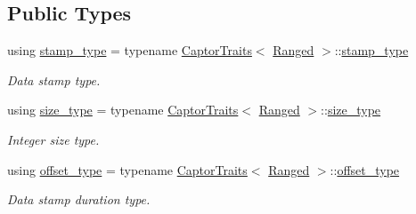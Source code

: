 \subsection*{Public Types}
\begin{DoxyCompactItemize}
\item 
\mbox{\label{classflow_1_1follower_1_1_ranged_aa2db50d33acca8540943e7de1d6da6ff}} 
using \hyperlink{classflow_1_1follower_1_1_ranged_aa2db50d33acca8540943e7de1d6da6ff}{stamp\+\_\+type} = typename \hyperlink{structflow_1_1_captor_traits}{Captor\+Traits}$<$ \hyperlink{classflow_1_1follower_1_1_ranged}{Ranged} $>$\+::\hyperlink{classflow_1_1follower_1_1_ranged_aa2db50d33acca8540943e7de1d6da6ff}{stamp\+\_\+type}
\begin{DoxyCompactList}\small\item\em Data stamp type. \end{DoxyCompactList}\item 
\mbox{\label{classflow_1_1follower_1_1_ranged_ae1fd4aebf292f42006e6185b32714c83}} 
using \hyperlink{classflow_1_1follower_1_1_ranged_ae1fd4aebf292f42006e6185b32714c83}{size\+\_\+type} = typename \hyperlink{structflow_1_1_captor_traits}{Captor\+Traits}$<$ \hyperlink{classflow_1_1follower_1_1_ranged}{Ranged} $>$\+::\hyperlink{classflow_1_1follower_1_1_ranged_ae1fd4aebf292f42006e6185b32714c83}{size\+\_\+type}
\begin{DoxyCompactList}\small\item\em Integer size type. \end{DoxyCompactList}\item 
\mbox{\label{classflow_1_1follower_1_1_ranged_ab5003d120aa00aaa2073625893228024}} 
using \hyperlink{classflow_1_1follower_1_1_ranged_ab5003d120aa00aaa2073625893228024}{offset\+\_\+type} = typename \hyperlink{structflow_1_1_captor_traits}{Captor\+Traits}$<$ \hyperlink{classflow_1_1follower_1_1_ranged}{Ranged} $>$\+::\hyperlink{classflow_1_1follower_1_1_ranged_ab5003d120aa00aaa2073625893228024}{offset\+\_\+type}
\begin{DoxyCompactList}\small\item\em Data stamp duration type. \end{DoxyCompactList}\end{DoxyCompactItemize}
